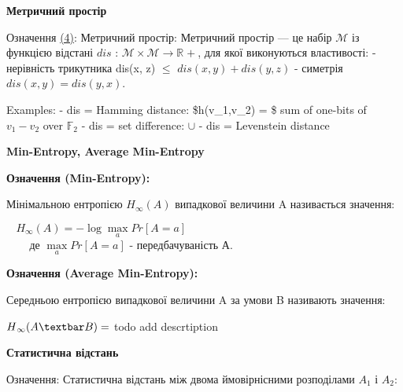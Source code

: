 \documentclass[11pt]{article}
\begin{document}
\vspace{5ex}
    \hypertarget{ux43cux435ux442ux440ux438ux447ux43dux438ux439-ux43fux440ux43eux441ux442ux456ux440}{%
\textbf{Метричний
простір}\label{ux43cux435ux442ux440ux438ux447ux43dux438ux439-ux43fux440ux43eux441ux442ux456ux440}}

Означення \hyperref[література]{(4)}: Метричний простір: Метричний
простір --- це набір \(\mathcal{M}\) із функцією відстані
\(\textit{dis}\) :
$\mathcal{M}\times\mathcal{M}\longrightarrow \mathbb{R}^{}+ $, для
якої виконуються властивості: - нерівність трикутника dis(x, z) $\leq$
\(\textit{dis}(x, y) + \textit{dis}(y, z)\) - симетрія
\(\textit{dis}(x, y) = \textit{dis}(y, x)\).

Examples: - dis = Hamming distance: \$h(v\_1,v\_2) = \$ sum of one-bits
of \(v_1-v_2\) over \(\mathbb{F}_2\) - dis = set difference: \(\cup\) -
dis = Levenstein distance
\vspace{15ex}

\hypertarget{min-entropy-average-min-entropy-statistical-distance}{%
\textbf{Min-Entropy, Average Min-Entropy}\label{min-entropy-average-min-entropy-statistical-distance}}

\vspace{2ex}

\bf{Означення (Min-Entropy):}
\normalfont

Мінімальною ентропією \(H_\infty(A)\) випадкової величини A називається
значення:

\(~~~~H_\infty(A) = -\log{\underset{a}{\max}}{Pr[A = a]}\)\\
\(~~~~~~~~\) де \(\underset{a}{\max}{Pr[A = a]}\) - передбачуваність А.

\vspace{3ex}

\bf{Означення (Average Min-Entropy):}
\normalfont

Середньою ентропією випадкової величини A за умови B називають значення:

$\overset{\text{~}}{H}_\infty(A\textbar B) = $ todo add descrtiption

\vspace{3ex}

    \hypertarget{ux441ux442ux430ux442ux438ux441ux442ux438ux447ux43dux430-ux432ux456ux434ux441ux442ux430ux43dux44c}{%
\textbf{Статистична
відстань}\label{ux441ux442ux430ux442ux438ux441ux442ux438ux447ux43dux430-ux432ux456ux434ux441ux442ux430ux43dux44c}}

Означення: Статистична відстань між двома ймовірнісними розподілами
\(A_1\) і \(A_2\):
\end{document}
